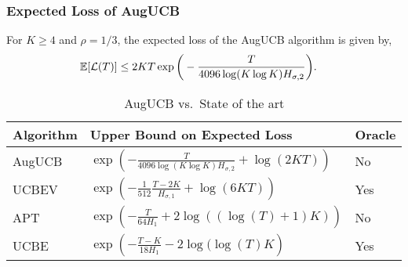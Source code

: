 \begin{frame}
\frametitle{Expected Loss of AugUCB}

\begin{theorem}
For $K\geq 4$ and $\rho={1}/{3}$,
the expected loss of the AugUCB algorithm is given by,
\begin{align*}
\mathbb{E}[\mathcal{L}(T)]
& \leq 2KT \exp\bigg(- \frac{T}{4096 \log( K\log K) H_{\sigma,2}} \bigg).
\end{align*}
\end{theorem}


\begin{table}[b]
\caption{AugUCB vs.\ State of the art}
\label{tab:regret-bds}
\begin{center}
\begin{tabular}{|p{1.5cm}|p{6.4cm}|p{1.5cm}|}
\hline
Algorithm  & Upper Bound on Expected Loss & Oracle \\
\hline
AugUCB      &$ \exp\left(- \frac{T}{4096 \log(K\log K)H_{\sigma,2}} + \log\left(2KT\right) \right) $ & No\\
\hline
UCBEV		&$\exp\left(-\frac{1}{512}\frac{T-2K}{H_{\sigma,1}} + \log\left(6KT\right)\right)$ & Yes\\
\hline
APT         &$\exp\left(-\frac{T}{64 H_1}+2\log((\log(T)+1)K)\right)$ & No\\
\hline
UCBE		&$\exp\left(-\frac{T-K}{18 H_1} - 2\log(\log(T)K\right)$ &  Yes\\
\hline

\end{tabular}
\end{center}
\end{table}
\end{frame}

%
%





